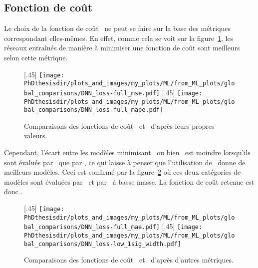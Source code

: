\subsection{Fonction de coût}
Le choix de la fonction de coût \Loss\ ne peut se faire sur la base des métriques correspondant elles-mêmes.
En effet, comme cela se voit sur la figure~\ref{fig-loss_mse_mape_themselves},
les réseaux entraînés de manière à minimiser une fonction de coût sont meilleurs selon cette métrique.
\begin{figure}[h]
\centering

\subcaptionbox{}[.45\textwidth]
{\texttt{[image: \\PhDthesisdir/plots\_and\_images/my\_plots/ML/from\_ML\_plots/global\_comparisons/DNN\_loss-full\_mse.pdf]}\vspace{-\baselineskip}}
\hfill
\subcaptionbox{}[.45\textwidth]
{\texttt{[image: \\PhDthesisdir/plots\_and\_images/my\_plots/ML/from\_ML\_plots/global\_comparisons/DNN\_loss-full\_mape.pdf]}\vspace{-\baselineskip}}

\caption{Comparaisons des fonctions de coût \LossMSE\ et \LossMAPE\ d'après leurs propres valeurs.}
\label{fig-loss_mse_mape_themselves}
\end{figure}
\par
Cependant, l'écart entre les modèles minimisant \LossMSE\ ou bien \LossMAPE\
est moindre lorsqu'ils sont évalués par \LossMSE\ que par \LossMAPE,
ce qui laisse à penser que l'utilisation de \LossMAPE\ donne de meilleurs modèles.
Ceci est confirmé par la figure~\ref{fig-loss_mse_mape_by_mae_and_low_1sigma} où ces deux catégories de modèles sont évaluées par \LossMAE\ et par \OneSigmaWidth\ à basse masse.
La fonction de coût retenue est donc \LossMAPE.
\begin{figure}[h]
\centering

\subcaptionbox{}[.45\textwidth]
{\texttt{[image: \\PhDthesisdir/plots\_and\_images/my\_plots/ML/from\_ML\_plots/global\_comparisons/DNN\_loss-full\_mae.pdf]}\vspace{-\baselineskip}}
\hfill
\subcaptionbox{}[.45\textwidth]
{\texttt{[image: \\PhDthesisdir/plots\_and\_images/my\_plots/ML/from\_ML\_plots/global\_comparisons/DNN\_loss-low\_1sig\_width.pdf]}\vspace{-\baselineskip}}

\caption{Comparaisons des fonctions de coût \LossMSE\ et \LossMAPE\ d'après d'autres métriques.}
\label{fig-loss_mse_mape_by_mae_and_low_1sigma}
\end{figure}
\newpage
